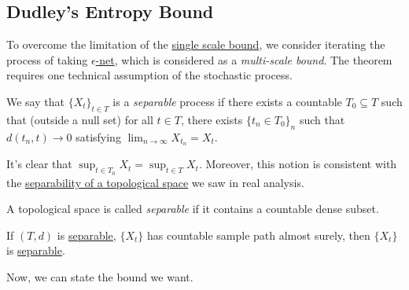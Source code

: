 \subsection{Dudley's Entropy Bound}
To overcome the limitation of the \hyperref[lma:single-scale-bound]{single scale bound}, we consider iterating the process of taking \hyperref[def:eps-net]{\(\epsilon\)-net}, which is considered as a \emph{multi-scale bound}. The theorem requires one technical assumption of the stochastic process.

\begin{definition}[Separable]\label{def:separable}
	We say that \(\{X_t\}_{t\in T}\) is a \emph{separable} process if there exists a countable \(T_0 \subseteq T\) such that (outside a null set) for all \(t\in T\), there exists \(\{t_n \in T_0\}_{n}\) such that \(d(t_n, t) \to 0\) satisfying \(\lim_{n \to \infty} X_{t_n} = X_t\).
\end{definition}

It's clear that \(\sup _{t\in T_0} X_t = \sup _{t\in T} X_t\). Moreover, this notion is consistent with the \hyperref[prev:separable]{separability of a topological space} we saw in real analysis.

\begin{prev}[Separable]\label{prev:separable}
	A topological space is called \emph{separable} if it contains a countable dense subset.
\end{prev}

\begin{eg}
	If \((T, d)\) is \hyperref[prev:separable]{separable}, \(\{ X_t \} \) has countable sample path almost surely, then \(\{ X_t \} \) is \hyperref[def:separable]{separable}.
\end{eg}

Now, we can state the bound we want.

